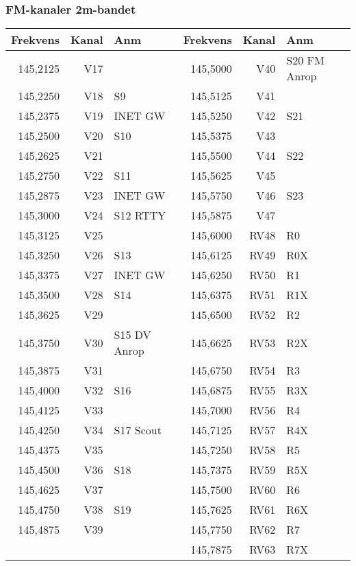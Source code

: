 \clearpage
\subsubsection{FM-kanaler 2m-bandet}

\begin{longtable}{rrl|rrl}

\textbf{Frekvens} & \textbf{Kanal} & \textbf{Anm} &
\textbf{Frekvens} & \textbf{Kanal} & \textbf{Anm} \\ \hline

145,2125 & V17 &              & 145,5000 & V40  & S20  FM Anrop \\
145,2250 & V18 & S9           & 145,5125 & V41  &               \\
145,2375 & V19 & INET GW      & 145,5250 & V42  & S21           \\
145,2500 & V20 & S10          & 145,5375 & V43  &               \\
145,2625 & V21 &              & 145,5500 & V44  & S22           \\
145,2750 & V22 & S11          & 145,5625 & V45  &               \\
145,2875 & V23 & INET GW      & 145,5750 & V46  & S23           \\
145,3000 & V24 & S12  RTTY    & 145,5875 & V47  &               \\
145,3125 & V25 &              & 145,6000 & RV48 & R0            \\
145,3250 & V26 & S13          & 145,6125 & RV49 & R0X           \\
145,3375 & V27 & INET GW      & 145,6250 & RV50 & R1            \\
145,3500 & V28 & S14          & 145,6375 & RV51 & R1X           \\
145,3625 & V29 &              & 145,6500 & RV52 & R2            \\
145,3750 & V30 & S15 DV Anrop & 145,6625 & RV53 & R2X           \\
145,3875 & V31 &              & 145,6750 & RV54 & R3            \\
145,4000 & V32 & S16          & 145,6875 & RV55 & R3X           \\
145,4125 & V33 &              & 145,7000 & RV56 & R4            \\
145,4250 & V34 & S17 Scout    & 145,7125 & RV57 & R4X           \\
145,4375 & V35 &              & 145,7250 & RV58 & R5            \\
145,4500 & V36 & S18          & 145,7375 & RV59 & R5X           \\
145,4625 & V37 &              & 145,7500 & RV60 & R6            \\
145,4750 & V38 & S19          & 145,7625 & RV61 & R6X           \\
145,4875 & V39 &              & 145,7750 & RV62 & R7            \\
         &     &              & 145,7875 & RV63 & R7X
\end{longtable}

